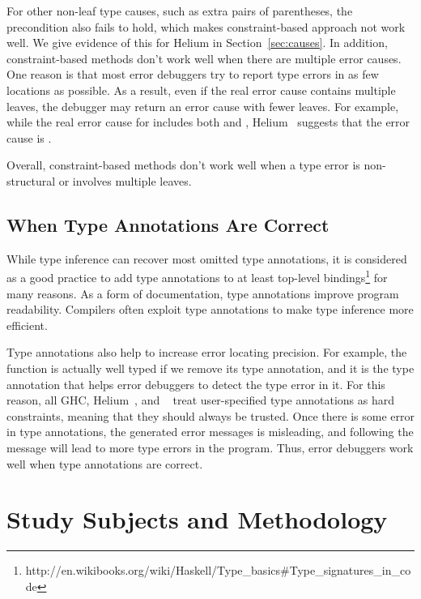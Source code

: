 \documentclass[12pt]{report}	%
\begin{document}
%
For other non-leaf type causes, such as extra pairs
of parentheses, the precondition also fails to hold,
which makes constraint-based approach not work well.
We give evidence of this
for Helium in Section~\ref{sec:causes}.
%
In addition, constraint-based methods don't work well when there are
multiple error causes. One reason is that most
error debuggers try to report type errors in as few locations
as possible. As a result, even if the real error cause contains
multiple leaves, the debugger may return an error cause with
fewer leaves. For example, while the real error cause for
 includes both \prog{(<)} and ,
Helium~\cite{Heeren05:TQT} suggests that the error cause
is .

Overall, constraint-based methods don't work well when a type
error is non-structural or involves multiple leaves.

\subsection{When Type Annotations Are Correct}
\label{sec:background:annotations}

While type inference can recover most omitted
type annotations, it is considered as a good
practice to add type annotations to at least
top-level bindings\footnote{http://en.wikibooks.org/wiki/Haskell/Type\_basics\#Type\_signatures\_in\_code}
for many reasons. As a form of documentation, type annotations improve
program readability. Compilers often exploit type annotations
to make type inference more efficient.

Type annotations also help to increase error
locating precision. For example,
the function  is
actually well typed if we remove its type annotation,
and it is the type annotation that helps error debuggers to detect
the type error in it. For this reason,
all GHC, Helium~\cite{Heeren03:HLH,Heeren05:TQT},
and \toolMin~\cite{Pavlinovic14:FMT,Pavlinovic15:PST}
treat user-specified type annotations as hard
constraints, meaning that they should always be trusted.
Once there is some error in type annotations, the
generated error messages is misleading, and following the
message will lead to more type errors in the program.
Thus, error debuggers work well when type annotations
are correct.

\section{Study Subjects and Methodology}
\label{sec:subjects}
\end{document}
